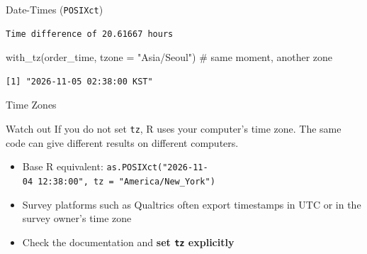 \documentclass[
  ignorenonframetext,
  aspectratio=169,
]{beamer}
\newenvironment{Shaded}{\begin{snugshade}}{\end{snugshade}}
\newcommand{\AttributeTok}[1]{\textcolor[rgb]{0.40,0.45,0.13}{#1}}
\newcommand{\CommentTok}[1]{\textcolor[rgb]{0.37,0.37,0.37}{#1}}
\newcommand{\FunctionTok}[1]{\textcolor[rgb]{0.28,0.35,0.67}{#1}}
\newcommand{\NormalTok}[1]{\textcolor[rgb]{0.00,0.23,0.31}{#1}}
\newcommand{\StringTok}[1]{\textcolor[rgb]{0.13,0.47,0.30}{#1}}
\providecommand{\tightlist}{%
  \setlength{\itemsep}{0pt}\setlength{\parskip}{0pt}}\usepackage{longtable,booktabs,array}
\begin{document}
\begin{frame}[fragile]{Date-Times (\texttt{POSIXct})}
\begingroup\tiny\color{darkgray}

\begin{verbatim}
Time difference of 20.61667 hours
\end{verbatim}

\endgroup

\begin{Shaded}
\begin{Highlighting}[]
\FunctionTok{with\_tz}\NormalTok{(order\_time, }\AttributeTok{tzone =} \StringTok{"Asia/Seoul"}\NormalTok{)        }\CommentTok{\# same moment, another zone}
\end{Highlighting}
\end{Shaded}

\begingroup\tiny\color{darkgray}

\begin{verbatim}
[1] "2026-11-05 02:38:00 KST"
\end{verbatim}

\endgroup
\end{frame}

\begin{frame}[fragile]{Time Zones}
\protect\hypertarget{time-zones}{}
\begin{alertblock}{Watch out}
\protect\hypertarget{watch-out}{}
If you do not set \texttt{tz}, R uses your computer's time zone. The
same code can give different results on different computers.

\begin{itemize}
\tightlist
\item
  Base R equivalent:
  \texttt{as.POSIXct("2026-11-04\ 12:38:00",\ tz\ =\ "America/New\_York")}
\item
  Survey platforms such as Qualtrics often export timestamps in UTC or
  in the survey owner's time zone
\item
  Check the documentation and \textbf{set \texttt{tz} explicitly}
\end{itemize}
\end{alertblock}
\end{frame}
\end{document}
